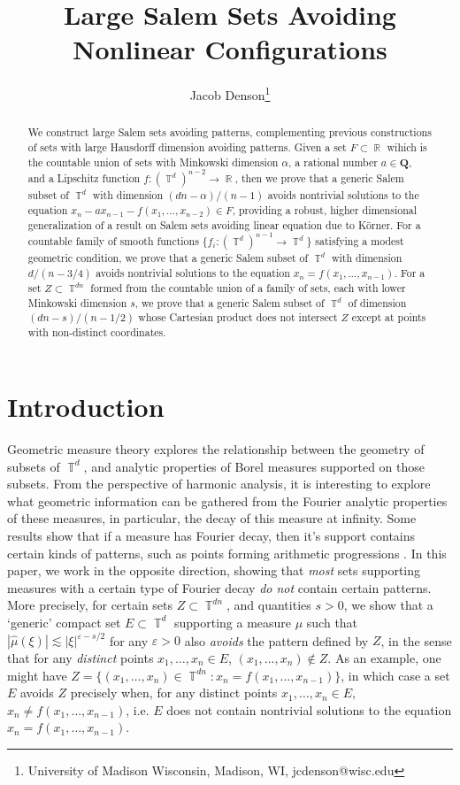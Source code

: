 \documentclass[dvipsnames,letterpaper,12pt]{article}
\title{Large Salem Sets Avoiding Nonlinear Configurations}
\author{Jacob Denson\footnote{University of Madison Wisconsin, Madison, WI, jcdenson@wisc.edu}}
\numberwithin{equation}{section}
\DeclareMathOperator{\RR}{\mathbb{R}}
\DeclareMathOperator{\TT}{\mathbb{T}}
\numberwithin{theorem}{section}
\begin{document}
\maketitle

\begin{abstract}
    We construct large Salem sets avoiding patterns, complementing previous constructions of sets with large Hausdorff dimension avoiding patterns. Given a set $F \subset \RR$ wihich is the countable union of sets with Minkowski dimension $\alpha$, a rational number $a \in \mathbf{Q}$, and a Lipschitz function $f: (\TT^d)^{n-2} \to \RR$, then we prove that a generic Salem subset of $\TT^d$ with dimension $(dn - \alpha) / (n-1)$ avoids nontrivial solutions to the equation $x_n - ax_{n-1} - f(x_1,\dots,x_{n-2}) \in F$, providing a robust, higher dimensional generalization of a result on Salem sets avoiding linear equation due to K\"{o}rner. For a countable family of smooth functions $\{ f_i : (\TT^d)^{n-1} \to \TT^d \}$ satisfying a modest geometric condition, we prove that a generic Salem subset of $\TT^d$ with dimension $d/(n-3/4)$ avoids nontrivial solutions to the equation $x_n = f(x_1,\dots,x_{n-1})$. For a set $Z \subset \TT^{dn}$ formed from the countable union of a family of sets, each with lower Minkowski dimension $s$, we prove that a generic Salem subset of $\TT^d$ of dimension $(dn - s)/(n - 1/2)$ whose Cartesian product does not intersect $Z$ except at points with non-distinct coordinates.
\end{abstract}

\section{Introduction}

Geometric measure theory explores the relationship between the geometry of subsets of $\TT^d$, and analytic properties of Borel measures supported on those subsets. From the perspective of harmonic analysis, it is interesting to explore what geometric information can be gathered from the Fourier analytic properties of these measures, in particular, the decay of this measure at infinity. Some results show that if a measure has Fourier decay, then it's support contains certain kinds of patterns, such as points forming arithmetic progressions \cite{ChanLabaPramanik, HenriotLabaPramanik,LabaPramanik}. In this paper, we work in the opposite direction, showing that \emph{most} sets supporting measures with a certain type of Fourier decay \emph{do not} contain certain patterns. More precisely, for certain sets $Z \subset \TT^{dn}$, and quantities $s > 0$, we show that a `generic' compact set $E \subset \TT^d$ supporting a measure $\mu$ such that $|\widehat{\mu}(\xi)| \lesssim |\xi|^{\varepsilon -s/2}$ for any $\varepsilon > 0$ also \emph{avoids} the pattern defined by $Z$, in the sense that for any \emph{distinct} points $x_1,\dots,x_n \in E$, $(x_1,\dots,x_n) \not \in Z$. As an example, one might have $Z = \{ (x_1,\dots,x_n) \in \TT^{dn}: x_n = f(x_1,\dots,x_{n-1}) \}$, in which case a set $E$ avoids $Z$ precisely when, for any distinct points $x_1,\dots,x_n \in E$, $x_n \neq f(x_1,\dots,x_{n-1})$, i.e. $E$ does not contain nontrivial solutions to the equation $x_n = f(x_1,\dots,x_{n-1})$.
\end{document}
